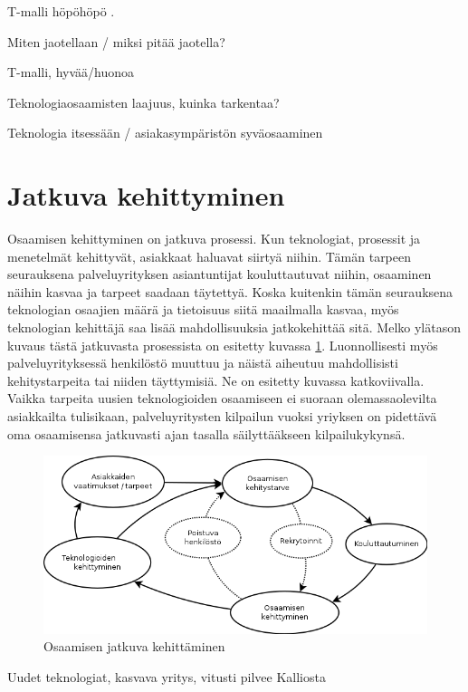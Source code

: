 \documentclass[a4paper,finnish,12pt]{article}
\begin{document}
T-malli höpöhöpö \cite{T-malli}.

Miten jaotellaan / miksi pitää jaotella?

T-malli, hyvää/huonoa

Teknologiaosaamisten laajuus, kuinka tarkentaa?

Teknologia itsessään / asiakasympäristön syväosaaminen

\clearpage

\section{Jatkuva kehittyminen}

Osaamisen kehittyminen on jatkuva prosessi. Kun teknologiat, prosessit ja menetelmät kehittyvät, asiakkaat haluavat siirtyä niihin. Tämän tarpeen seurauksena palveluyrityksen asiantuntijat kouluttautuvat niihin, osaaminen näihin kasvaa ja tarpeet saadaan täytettyä. Koska kuitenkin tämän seurauksena teknologian osaajien määrä ja tietoisuus siitä maailmalla kasvaa, myös teknologian kehittäjä saa lisää mahdollisuuksia jatkokehittää sitä. Melko ylätason kuvaus tästä jatkuvasta prosessista on esitetty kuvassa \ref{fig:perusympyra}. Luonnollisesti myös palveluyrityksessä henkilöstö muuttuu ja näistä aiheutuu mahdollisisti kehitystarpeita tai niiden täyttymisiä. Ne on esitetty kuvassa katkoviivalla. Vaikka tarpeita uusien teknologioiden osaamiseen ei suoraan olemassaolevilta asiakkailta tulisikaan, palveluyritysten kilpailun vuoksi yriyksen on pidettävä oma osaamisensa jatkuvasti ajan tasalla säilyttääkseen kilpailukykynsä.

\begin{figure}[ht]
\centering
\includegraphics[scale=0.5]{knowledge_circle.png}
\caption{Osaamisen jatkuva kehittäminen}
\label{fig:perusympyra}
\end{figure}

Uudet teknologiat, kasvava yritys, vitusti pilvee Kalliosta
\end{document}
